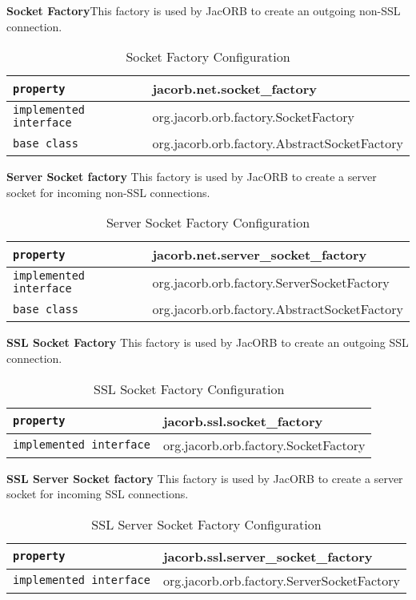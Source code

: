 \pagebreak
\textbf{Socket Factory}This factory is used by JacORB to create an outgoing non-SSL connection.
\begin{small}
\begin{longtable}{|p{5cm}|p{7.5cm}|}
\caption{Socket Factory Configuration}\\
\hline
\verb"property" & jacorb.net.socket\_factory\\
\hline
\verb"implemented interface" & org.jacorb.orb.factory.SocketFactory\\
\hline
\verb"base class" & org.jacorb.orb.factory.AbstractSocketFactory\\
\hline
\end{longtable}
\end{small}

\textbf{Server Socket factory}
This factory is used by JacORB to create a server socket for incoming non-SSL connections.
\begin{small}
\begin{longtable}{|p{5cm}|p{7.5cm}|}
\caption{Server Socket Factory Configuration}\\
\hline
\verb"property" & jacorb.net.server\_socket\_factory\\
\hline
\verb"implemented interface" & org.jacorb.orb.factory.ServerSocketFactory\\
\hline
\verb"base class" & org.jacorb.orb.factory.AbstractSocketFactory\\
\hline
\end{longtable}
\end{small}

\textbf{SSL Socket Factory}
This factory is used by JacORB to create an outgoing SSL connection.
\begin{small}
\begin{longtable}{|p{5cm}|p{7.5cm}|}
\caption{SSL Socket Factory Configuration}\\
\hline
\verb"property" & jacorb.ssl.socket\_factory\\
\hline
\verb"implemented interface" & org.jacorb.orb.factory.SocketFactory\\
\hline
\end{longtable}
\end{small}

\textbf{SSL Server Socket factory}
This factory is used by JacORB to create a server socket for incoming SSL connections.
\begin{small}
\begin{longtable}{|p{5cm}|p{7.5cm}|}
\caption{SSL Server Socket Factory Configuration}\\
\hline
\verb"property" & jacorb.ssl.server\_socket\_factory\\
\hline
\verb"implemented interface" & org.jacorb.orb.factory.ServerSocketFactory\\
\hline
\end{longtable}
\end{small}

